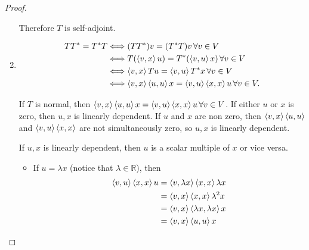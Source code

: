 \begin{proof}
\begin{enumerate}[label={(\alph*)}]
              Therefore $T$ is self-adjoint.
        \item \begin{align*}
                  TT^{*} = T^{*}T & \Longleftrightarrow (TT^{*})v = (T^{*}T)v\,\forall v\in V                                                  \\
                                  & \Longleftrightarrow T(\left\langle{v, x}\right\rangle u) = T^{*}(\left\langle{v, u}\right\rangle x)\,\forall v\in V                        \\
                                  & \Longleftrightarrow \left\langle{v, x}\right\rangle Tu = \left\langle{v, u}\right\rangle T^{*}x \,\forall v\in V                           \\
                                  & \Longleftrightarrow \left\langle{v, x}\right\rangle\left\langle{u, u}\right\rangle x = \left\langle{v, u}\right\rangle\left\langle{x, x}\right\rangle u\,\forall v\in V.
              \end{align*}

              If $T$ is normal, then $\left\langle{v, x}\right\rangle\left\langle{u, u}\right\rangle x = \left\langle{v, u}\right\rangle\left\langle{x, x}\right\rangle u\,\forall v\in V$. If either $u$ or $x$ is zero, then $u, x$ is linearly dependent. If $u$ and $x$ are non zero, then $\left\langle{v, x}\right\rangle\left\langle{u, u}\right\rangle$ and $\left\langle{v, u}\right\rangle\left\langle{x, x}\right\rangle$ are not simultaneously zero, so $u, x$ is linearly dependent.

              If $u, x$ is linearly dependent, then $u$ is a scalar multiple of $x$ or vice versa.
              \begin{itemize}
                  \item If $u = \lambda x$ (notice that $\lambda\in\mathbb{R}$), then
                        \begin{align*}
                            \left\langle{v, u}\right\rangle\left\langle{x, x}\right\rangle u & = \left\langle{v, \lambda x}\right\rangle\left\langle{x, x}\right\rangle\lambda x \\
                                                              & = \left\langle{v, x}\right\rangle\left\langle{x, x}\right\rangle\lambda^{2} x     \\
                                                              & = \left\langle{v, x}\right\rangle\left\langle{\lambda x, \lambda x}\right\rangle x \\
                                                              & = \left\langle{v, x}\right\rangle\left\langle{u, u}\right\rangle x
                        \end{align*}


\end{itemize}
\end{enumerate}
\end{proof}
